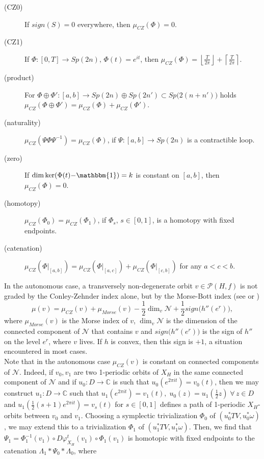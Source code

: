 \documentclass[a4paper,12pt,bibliography=totocnumbered,titlepage=false,abstracton,bookmarksnumbered=true]{scrartcl}
\theoremstyle{definition}
\begin{document}
\begin{description}
 \item[(CZ0)] If $sign(S)=0$ everywhere, then $\mu_{CZ}(\Phi)=0$.\label{CZ0}
 \item[(CZ1)] If $\Phi:[0,T]\rightarrow Sp(2n),\,\Phi(t)=e^{it}$, then $\displaystyle\mu_{CZ}(\Phi)=\left\lfloor\frac{T}{2\pi}\right\rfloor + \left\lceil\frac{T}{2\pi}\right\rceil.$
 \item[(product)] For $\Phi{\oplus}\Phi': [a,b]\rightarrow Sp(2n){\oplus} Sp(2n')\subset Sp\big(2(n{+}n')\big)$ holds \\$\mu_{CZ}(\Phi{\oplus}\Phi')=\mu_{CZ}(\Phi)+\mu_{CZ}(\Phi')$.
 \item[(naturality)] $\mu_{CZ}(\Psi\Phi\Psi^{-1})=\mu_{CZ}(\Phi)$, if $\Psi: [a,b]\rightarrow Sp(2n)$ is a contractible loop.
 \item[(zero)] If $\dim \ker(\Phi(t){-}\mathbbm{1})=k$ is constant on $[a,b]$, then $\mu_{CZ}(\Phi)=0$.
 \item[(homotopy)] $\mu_{CZ}(\Phi_0)=\mu_{CZ}(\Phi_1)$, if $\Phi_s, \, s\in[0,1]$, is a homotopy with fixed endpoints.
 \item[(catenation)] $\mu_{CZ}(\Phi|_{[a,b]})=\mu_{CZ}(\Phi|_{[a,c]})+\mu_{CZ}(\Phi|_{[c,b]})$ for any $a<c<b$. 
\end{description}
In the autonomous case, a transversely non-degenerate orbit $v\in\mathcal{P}(H,f)$ is not graded by the Conley-Zehnder index alone, but by the Morse-Bott index (see \cite{BourOan1} or \cite{FraCie})
\begin{equation}\label{eqmu}
 \mu(v)=\mu_{CZ}(v)+\mu_{Morse}(v)-{\textstyle\frac{1}{2}}\dim_v\mathcal{N}+{\textstyle\frac{1}{2}} sign \big(h''(e^r)\big),
\end{equation}
where $\mu_{Morse}(v)$ is the Morse index of $v$, $\dim_v\mathcal{N}$ is the dimension of the connected component of $\mathcal{N}$ that contains $v$ and $sign \big(h''(e^r)\big)$ is the sign of $h''$ on the level $e^r$, where $v$ lives. If $h$ is convex, then this sign is ${+}1$, a situation encountered in most cases.\\
Note that in the autonomous case $\mu_{CZ}(v)$ is constant on connected components of $\mathcal{N}$. Indeed, if $v_0, v_1$ are two 1-periodic orbits of $X_H$ in the same connected component of $\mathcal{N}$ and if $u_0: D\rightarrow\mathbb{C}$ is such that $u_0(e^{2\pi it})=v_0(t)$, then we may construct $u_1:D\rightarrow\mathbb{C}$ such that $u_1(e^{2\pi it})=v_1(t),\; u_0(z)=u_1(\frac{1}{2}z)\;\forall\, z {\in} D$ and $u_1(\frac{1}{2}(s{+}1)e^{2\pi it})=v_s(t)$ for $s\in[0,1]$ defines a path of 1-periodic $X_H$-orbits between $v_0$ and $v_1$. Choosing a symplectic trivialization $\Phi_0$ of $(u_0^\ast TV, u_0^\ast\omega)$, we may extend  this to a trivialization $\Phi_1$ of $(u_1^\ast TV, u_1^\ast\omega)$. Then, we find that $\Psi_1=\Phi_1^{-1}(v_1)\circ D\varphi^t_{X_H}(v_1)\circ \Phi_1(v_1)$ is homotopic with fixed endpoints to the catenation $\Lambda_1\ast\Psi_0\ast\Lambda_0$, where 
\end{document}
